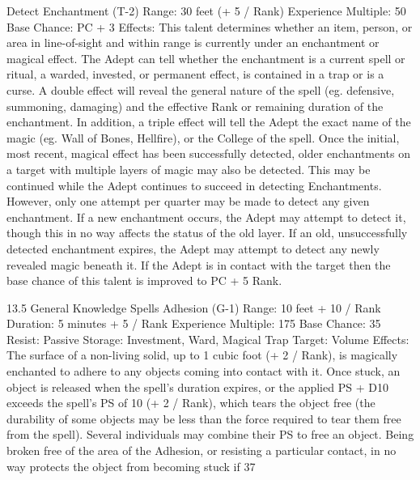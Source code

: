 \documentclass[a4paper]{article}
\begin{document}
\begin{multicols}{3}
Detect Enchantment (T-2)
Range: 30 feet (+ 5 / Rank)
Experience Multiple: 50
Base Chance: PC + 3%
Effects: This talent determines whether an item,
person, or area in line-of-sight and within range is
currently under an enchantment or magical effect.
The Adept can tell whether the enchantment is a
current spell or ritual, a warded, invested, or permanent effect, is contained in a trap or is a curse. A
double effect will reveal the general nature of the
spell (eg. defensive, summoning, damaging) and
the effective Rank or remaining duration of the
enchantment. In addition, a triple effect will tell the
Adept the exact name of the magic (eg. Wall of
Bones, Hellfire), or the College of the spell.
Once the initial, most recent, magical effect has
been successfully detected, older enchantments on
a target with multiple layers of magic may also be
detected. This may be continued while the Adept
continues to succeed in detecting Enchantments.
However, only one attempt per quarter may be
made to detect any given enchantment. If a new
enchantment occurs, the Adept may attempt to
detect it, though this in no way affects the status of
the old layer. If an old, unsuccessfully detected
enchantment expires, the Adept may attempt to
detect any newly revealed magic beneath it.
If the Adept is in contact with the target then the
base chance of this talent is improved to PC + 5%
Rank.

13.5 General Knowledge Spells
Adhesion (G-1)
Range: 10 feet + 10 / Rank
Duration: 5 minutes + 5 / Rank
Experience Multiple: 175
Base Chance: 35%
Resist: Passive
Storage: Investment, Ward, Magical Trap
Target: Volume
Effects: The surface of a non-living solid, up to 1
cubic foot (+ 2 / Rank), is magically enchanted to
adhere to any objects coming into contact with it.
Once stuck, an object is released when the spell’s
duration expires, or the applied PS + D10 exceeds
the spell’s PS of 10 (+ 2 / Rank), which tears the
object free (the durability of some objects may be
less than the force required to tear them free from
the spell). Several individuals may combine their
PS to free an object. Being broken free of the area
of the Adhesion, or resisting a particular contact, in
no way protects the object from becoming stuck if
37


\end{multicols}
\end{document}
